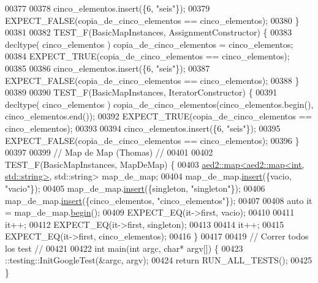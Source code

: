\begin{DoxyCode}
00377 
00378     cinco\_elementos.insert(\{6, \textcolor{stringliteral}{"seis"}\});
00379     EXPECT\_FALSE(copia\_de\_cinco\_elementos == cinco\_elementos);
00380 \}
00381 
00382 TEST\_F(BasicMapInstances, AssignmentConstructor) \{
00383     decltype( cinco\_elementos ) copia\_de\_cinco\_elementos = cinco\_elementos;
00384     EXPECT\_TRUE(copia\_de\_cinco\_elementos == cinco\_elementos);
00385 
00386     cinco\_elementos.insert(\{6, \textcolor{stringliteral}{"seis"}\});
00387     EXPECT\_FALSE(copia\_de\_cinco\_elementos == cinco\_elementos);
00388 \}
00389 
00390 TEST\_F(BasicMapInstances, IteratorConstructor) \{
00391     decltype( cinco\_elementos ) copia\_de\_cinco\_elementos(cinco\_elementos.begin(), cinco\_elementos.end());
00392     EXPECT\_TRUE(copia\_de\_cinco\_elementos == cinco\_elementos);
00393 
00394     cinco\_elementos.insert(\{6, \textcolor{stringliteral}{"seis"}\});
00395     EXPECT\_FALSE(copia\_de\_cinco\_elementos == cinco\_elementos);
00396 \}
00397 
00399 \textcolor{comment}{// Map de Map (Thomas) //}
00401 \textcolor{comment}{}
00402 TEST\_F(BasicMapInstances, MapDeMap) \{
00403     \hyperlink{classaed2_1_1map}{aed2::map<aed2::map<int, std::string>}, std::string> map\_de\_map;
00404     map\_de\_map.\hyperlink{classaed2_1_1map_a6941cde9a79c27f054b5c97a587a1854_a6941cde9a79c27f054b5c97a587a1854}{insert}(\{vacio, \textcolor{stringliteral}{"vacio"}\});
00405     map\_de\_map.\hyperlink{classaed2_1_1map_a6941cde9a79c27f054b5c97a587a1854_a6941cde9a79c27f054b5c97a587a1854}{insert}(\{singleton, \textcolor{stringliteral}{"singleton"}\});
00406     map\_de\_map.\hyperlink{classaed2_1_1map_a6941cde9a79c27f054b5c97a587a1854_a6941cde9a79c27f054b5c97a587a1854}{insert}(\{cinco\_elementos, \textcolor{stringliteral}{"cinco\_elementos"}\});
00407 
00408     \textcolor{keyword}{auto} it = map\_de\_map.\hyperlink{classaed2_1_1map_a58a95705d54b3dda7f775ce5a22225cb_a58a95705d54b3dda7f775ce5a22225cb}{begin}();
00409     EXPECT\_EQ(it->first, vacio);
00410 
00411     it++;
00412     EXPECT\_EQ(it->first, singleton);
00413 
00414     it++;
00415     EXPECT\_EQ(it->first, cinco\_elementos);
00416 \}
00417 
00419 \textcolor{comment}{// Correr todos los test //}
00421 \textcolor{comment}{}
00422 \textcolor{keywordtype}{int} main(\textcolor{keywordtype}{int} argc, \textcolor{keywordtype}{char}* argv[]) \{
00423     ::testing::InitGoogleTest(&argc, argv);
00424     \textcolor{keywordflow}{return} RUN\_ALL\_TESTS();
00425 \}
\end{DoxyCode}
